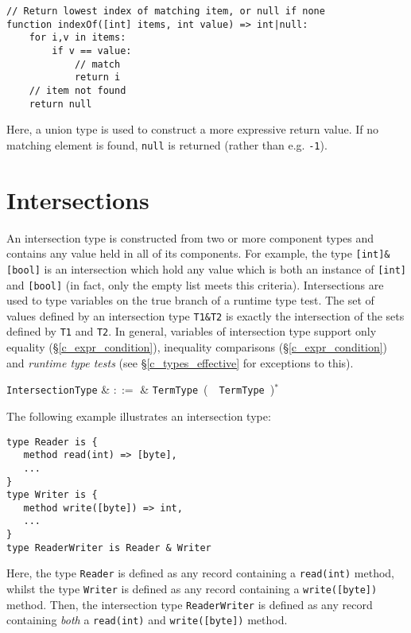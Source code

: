 \begin{lstlisting}
// Return lowest index of matching item, or null if none
function indexOf([int] items, int value) => int|null:
    for i,v in items:
        if v == value:
            // match
            return i
    // item not found
    return null
\end{lstlisting}

Here, a union type is used to construct a more expressive return value.  If no matching element is found, \lstinline{null} is returned (rather than e.g. \lstinline{-1}).


\section{Intersections}
\label{c_types_intersections}

An intersection type is constructed from two or more component types and contains any value held in all of its components.  For example, the type \lstinline{[int]&[bool]} is an intersection which hold any value which is both an instance of \lstinline{[int]} and \lstinline{[bool]} (in fact, only the empty list meets this criteria).  Intersections are used to type variables on the true branch of a runtime type test.  The set of values defined by an intersection type \lstinline{T1&T2} is exactly the intersection of the sets defined by \lstinline{T1} and \lstinline{T2}.  In general, variables of intersection type support only equality (\S\ref{c_expr_condition}), inequality comparisons (\S\ref{c_expr_condition}) and {\em runtime type tests} (see \S\ref{c_types_effective} for exceptions to this).

\begin{syntax}
  \verb+IntersectionType+ & $::=$ & \verb+TermType+\ \big(\ \token{\&}\ \verb+TermType+\
  \big)$^*$\\
\end{syntax}

\noindent The following example illustrates an intersection type:

\begin{lstlisting}
type Reader is { 
   method read(int) => [byte],
   ...
}
type Writer is { 
   method write([byte]) => int,
   ...
}
type ReaderWriter is Reader & Writer
\end{lstlisting}
Here, the type \lstinline{Reader} is defined as any record containing a \lstinline{read(int)} method, whilst the type \lstinline{Writer} is defined as any record containing a \lstinline{write([byte])} method.  Then, the intersection type \lstinline{ReaderWriter} is defined as any record containing {\em both} a \lstinline{read(int)} and \lstinline{write([byte])} method.

